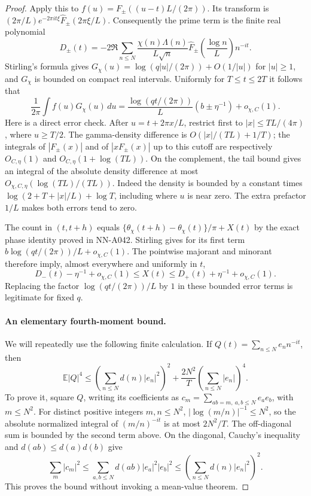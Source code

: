\begin{proof}
Apply this to $f(u)=F_\pm((u-t)L/(2\pi))$. Its transform is
$(2\pi/L)e^{-2\pi it\xi}\widehat F_\pm(2\pi\xi/L)$.
Consequently the prime term is the finite real polynomial
\[
 D_\pm(t)=-2\Re\sum_{n\le N}
  \frac{\chi(n)\Lambda(n)}{L\sqrt n}
  \widehat F_\pm\left(\frac{\log n}{L}\right)n^{-it}.
\]
Stirling's formula gives
$G_\chi(u)=\log(q|u|/(2\pi))+O(1/|u|)$ for $|u|\ge1$,
and $G_\chi$ is bounded on compact real intervals. Uniformly for
$T\le t\le2T$ it follows that
\begin{equation}\label{eq:A042-direct-arch}
 \frac1{2\pi}\int f(u)G_\chi(u)\,du
 =\frac{\log(qt/(2\pi))}{L}(b\pm\eta^{-1})
                      +o_{\chi,C}(1).
\end{equation}
Here is a direct error check. After $u=t+2\pi x/L$, restrict
first to $|x|\le TL/(4\pi)$, where $u\ge T/2$.
The gamma-density difference is
$O(|x|/(TL)+1/T)$; the integrals of $|F_\pm(x)|$ and of
$|xF_\pm(x)|$ up to this cutoff are respectively
$O_{C,\eta}(1)$ and $O_{C,\eta}(1+\log(TL))$.
On the complement, the tail bound gives an integral of the
absolute density difference at most
$O_{\chi,C,\eta}(\log(TL)/(TL))$.
Indeed the density is bounded by a constant times
$\log(2+T+|x|/L)+\log T$, including where $u$ is near zero.
The extra prefactor $1/L$ makes both errors tend to zero.

The count in $(t,t+h)$ equals
$\{\theta_\chi(t+h)-\theta_\chi(t)\}/\pi+X(t)$ by the
exact phase identity proved in NN-A042. Stirling gives for its
first term $b\log(qt/(2\pi))/L+o_{\chi,C}(1)$.
The pointwise majorant and minorant therefore imply, almost
everywhere and uniformly in $t$,
\begin{equation}\label{eq:A042-direct-sandwich}
 D_-(t)-\eta^{-1}+o_{\chi,C}(1)
       \le X(t)\le
 D_+(t)+\eta^{-1}+o_{\chi,C}(1).
\end{equation}
Replacing the factor $\log(qt/(2\pi))/L$ by $1$ in these
bounded error terms is legitimate for fixed $q$.

\paragraph{An elementary fourth-moment bound.}
We will repeatedly use the following finite calculation.
If $Q(t)=\sum_{n\le N}e_n n^{-it}$, then
\begin{equation}\label{eq:A042-direct-DPbound}
 \mathbb E|Q|^4
 \le \left(\sum_{n\le N}d(n)|e_n|^2\right)^2
       +\frac{2N^2}{T}\left(\sum_{n\le N}|e_n|\right)^4.
\end{equation}
To prove it, square $Q$, writing its coefficients as
$c_m=\sum_{ab=m,\ a,b\le N}e_a e_b$, with $m\le N^2$.
For distinct positive integers $m,n\le N^2$,
$|\log(m/n)|^{-1}\le N^2$, so the absolute normalized
integral of $(m/n)^{-it}$ is at most $2N^2/T$.
The off-diagonal sum is bounded by the second term above.
On the diagonal, Cauchy's inequality and
$d(ab)\le d(a)d(b)$ give
\[
 \sum_m|c_m|^2
 \le\sum_{a,b\le N}d(ab)|e_a|^2|e_b|^2
 \le\left(\sum_{n\le N}d(n)|e_n|^2\right)^2.
\]
This proves the bound without invoking a mean-value theorem.


\end{proof}
